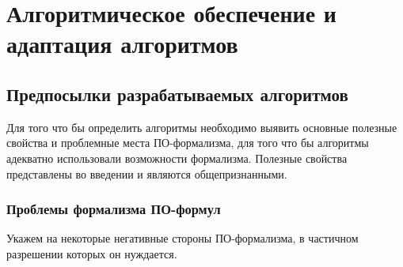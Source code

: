 \chapter{Алгоритмическое обеспечение и адаптация алгоритмов}


\section{Предпосылки разрабатываемых алгоритмов}

Для того что бы определить алгоритмы необходимо выявить основные полезные свойства и проблемные места ПО-формализма, для того что бы алгоритмы адекватно использовали возможности формализма. Полезные свойства представлены во введении и являются общепризнанными.

\subsection{Проблемы формализма ПО-формул}
Укажем на некоторые негативные стороны ПО-формализма, в частичном разрешении которых он нуждается.

